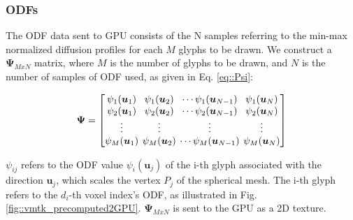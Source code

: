 \documentclass[twoside,twocolumn,10pt]{article}
\begin{document}



\subsubsection{ODFs}

The ODF data sent to GPU consists of the N samples referring to the min-max normalized diffusion profiles for each $M$ glyphs to be drawn. We construct a $\bm{\Psi}_{MxN}$ matrix, where $M$ is the number of glyphs to be drawn, and $N$ is the number of samples of ODF used, as given in Eq. \ref{eq::Psi}:

\begin{equation}
\label{eq::Psi}
\bm{\Psi} = 
\begingroup %
\setlength\arraycolsep{2pt}
\begin{bmatrix} 
    \psi_1(\bm{u}_1) & \psi_1(\bm{u}_2) & \cdots \psi_1(\bm{u}_{N-1}) & \psi_1(\bm{u}_{N})  \\    
     \psi_2(\bm{u}_1)& \psi_2(\bm{u}_2) & \cdots \psi_2(\bm{u}_{N-1}) & \psi_2(\bm{u}_{N}) \\
    \vdots & \vdots & \vdots & \vdots  \\    
     \psi_M(\bm{u}_1)&\psi_M(\bm{u}_2) & \cdots \psi_M(\bm{u}_{N-1}) & \psi_M(\bm{u}_{N})
\end{bmatrix}
\endgroup
\end{equation}

$\psi_{ij}$ refers to the ODF value $\psi_i(\bm{u}_j)$ of the i-th glyph associated with the direction $\bm{u}_j$, which scales the vertex $P_j$ of the spherical mesh. The i-th glyph refers to the $d_i$-th voxel index's ODF, as illustrated in Fig. \ref{fig::vmtk_precomputed2GPU}. $\bm{\Psi}_{MxN}$ is sent to the GPU as a 2D texture.
\end{document}
